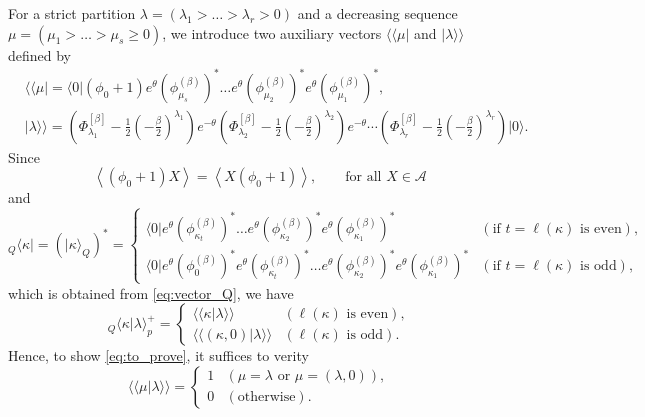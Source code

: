 \documentclass{amsart}
\def\ket#1{\vert #1 \rangle}
\def\bra#1{\langle #1 \vert}
\def\kket#1{\vert #1 \rangle\!\rangle}
\def\bbra#1{\langle\!\langle #1 \vert}
\def\iinner#1#2{\langle\!\langle #1|#2\rangle\!\rangle}
\begin{document}
For a strict partition $\lambda=(\lambda_1>\dots>\lambda_r>0)$ and a decreasing sequence
$\mu=(\mu_1>\dots>\mu_s\geq 0)$,
we introduce two auxiliary vectors $\bbra{\mu}$ and $\kket{\lambda}$ defined by
\[
\begin{aligned}
&
\bbra{\mu}=\bra{0}(\phi_0+1)
e^\theta (\phi^{(\beta)}_{\mu_s})^\ast
\dots
e^\theta (\phi^{(\beta)}_{\mu_2})^\ast
e^\theta (\phi^{(\beta)}_{\mu_1})^\ast,\\
&
\kket{\lambda}=
\left(\Phi^{[\beta]}_{\lambda_1}-\tfrac{1}{2}(-\tfrac{\beta}{2})^{\lambda_1}\right)e^{-\theta}
\left(\Phi^{[\beta]}_{\lambda_2}-\tfrac{1}{2}(-\tfrac{\beta}{2})^{\lambda_2}\right)e^{-\theta}
\cdots
\left(\Phi^{[\beta]}_{\lambda_r}-\tfrac{1}{2}(-\tfrac{\beta}{2})^{\lambda_r}\right)\ket{0}.
\end{aligned}
\]
Since
\[
\left\langle (\phi_0+1)X\right\rangle
=
\left\langle X(\phi_0+1)\right\rangle,\qquad
\text{for all }X\in \mathcal{A}
\]
and
\[
{}_Q\bra{\kappa}=
(\ket{\kappa}_Q)^\ast=
\begin{cases}
\bra{0}e^\theta (\phi^{(\beta)}_{\kappa_t})^\ast
\dots
e^\theta (\phi^{(\beta)}_{\kappa_2})^\ast
e^\theta (\phi^{(\beta)}_{\kappa_1})^\ast& (\text{if }t=\ell(\kappa)\mbox{ is even}),\\
\bra{0}e^\theta (\phi^{(\beta)}_{0})^\ast e^\theta (\phi^{(\beta)}_{\kappa_t})^\ast
\dots
e^\theta (\phi^{(\beta)}_{\kappa_2})^\ast
e^\theta (\phi^{(\beta)}_{\kappa_1})^\ast  & (\text{if }t=\ell(\kappa)\mbox{ is odd}),
\end{cases}
\]
which is obtained from \eqref{eq:vector_Q}, we have
\[
{}_{Q}\langle
\kappa|\lambda
\rangle^+_p=
\begin{cases}
\iinner{\kappa}{\lambda} & (\ell(\kappa)\text{ is even} ),\\
\iinner{(\kappa,0)}{\lambda} & (\ell(\kappa)\text{ is odd} ).
\end{cases}
\]
Hence, to show \eqref{eq:to_prove}, it suffices to verity
\begin{equation}\label{eq:mokuhyou}
\iinner{\mu}{\lambda}=
\begin{cases}
1 & (\mu=\lambda \text{ or } \mu=(\lambda,0)),\\
0 & (\text{otherwise}).
\end{cases}
\end{equation}
\end{document}
